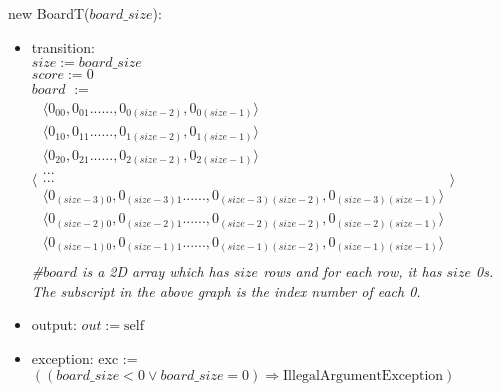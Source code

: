 \documentclass[12pt]{article}
\begin{document}
\noindent new BoardT($\mathit{board\_size}$):
\begin{itemize}
\item transition:\\
$\mathit{size} := \mathit{board\_size}$\\
$\mathit{score} := 0$\\
$\mathit{board}$ $:=$ 
      $\langle \begin{array}{c}
      \langle \mbox{0}_{00}, \mbox{0}_{01} ... ... ,\mbox{0}_{0(\mathit{size} - 2)}, \mbox{0}_{0(\mathit{size} - 1)} \rangle\\
      
      \langle \mbox{0}_{10}, \mbox{0}_{11} ... ... ,\mbox{0}_{1(\mathit{size} - 2)}, \mbox{0}_{1(\mathit{size} - 1)} \rangle\\
      
      \langle \mbox{0}_{20}, \mbox{0}_{21} ... ... ,\mbox{0}_{2(\mathit{size} - 2)}, \mbox{0}_{2(\mathit{size} - 1)} \rangle\\
      
      
      ...\\
      ...\\
      
      \langle \mbox{0}_{(\mathit{size} - 3)0}, \mbox{0}_{(\mathit{size} - 3)1} ... ... ,\mbox{0}_{(\mathit{size} - 3)(\mathit{size} - 2)}, \mbox{0}_{(\mathit{size} - 3)(\mathit{size} - 1)} \rangle\\
      
      
      \langle \mbox{0}_{(\mathit{size} - 2)0}, \mbox{0}_{(\mathit{size} - 2)1} ... ... ,\mbox{0}_{(\mathit{size} - 2)(\mathit{size} - 2)}, \mbox{0}_{(\mathit{size} - 2)(\mathit{size} - 1)} \rangle\\
      
      
      \langle \mbox{0}_{(\mathit{size} - 1)0}, \mbox{0}_{(\mathit{size} - 1)1} ... ... ,\mbox{0}_{(\mathit{size} - 1)(\mathit{size} - 2)}, \mbox{0}_{(\mathit{size} - 1)(\mathit{size} - 1)} \rangle\\
      
      
      \end{array} \rangle$ \\ 

\textit{\#$\mathit{board}$ is a 2D array which has $\mathit{size}$ rows
and for each row, it has $\mathit{size}$ 0s. The subscript in the above graph is the index number of each 0.}

\item output: $out := \mbox{self}$
\item exception: exc := $((\mathit{board\_size} < 0 \lor \mathit{board\_size} = 0) \Rightarrow \text{IllegalArgumentException})$
\end{itemize}
\end{document}
